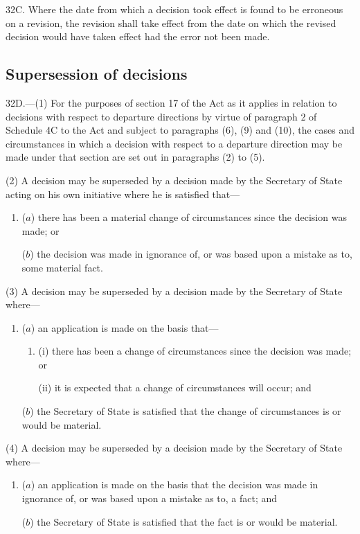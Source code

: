 \documentclass[12pt,a4paper]{article}
\begin{document}
32C.  Where the date from which a decision took effect is found to be erroneous on a revision, the revision shall take effect from the date on which the revised decision would have taken effect had the error not been made.


\subsection[32D. Supersession of decisions]{Supersession of decisions}

32D.—(1) For the purposes of section 17 of the Act as it applies in relation to decisions with respect to departure directions by virtue of paragraph 2 of Schedule 4C to the Act and subject to paragraphs (6), (9) and (10), the cases and circumstances in which a decision with respect to a departure direction may be made under that section are set out in paragraphs (2) to (5).

(2) A decision may be superseded by a decision made by the Secretary of State acting on his own initiative where he is satisfied that---
\begin{enumerate}\item[]
($a$) there has been a material change of circumstances since the decision was made; or

($b$) the decision was made in ignorance of, or was based upon a mistake as to, some material fact.
\end{enumerate}

(3) A decision may be superseded by a decision made by the Secretary of State where---
\begin{enumerate}\item[]
($a$) an application is made on the basis that---
\begin{enumerate}\item[]
(i) there has been a change of circumstances since the decision was made; or

(ii) it is expected that a change of circumstances will occur; and
\end{enumerate}

($b$) the Secretary of State is satisfied that the change of circumstances is or would be material.
\end{enumerate}

(4) A decision may be superseded by a decision made by the Secretary of State where---
\begin{enumerate}\item[]
($a$) an application is made on the basis that the decision was made in ignorance of, or was based upon a mistake as to, a fact; and

($b$) the Secretary of State is satisfied that the fact is or would be material.
\end{enumerate}
\end{document}
